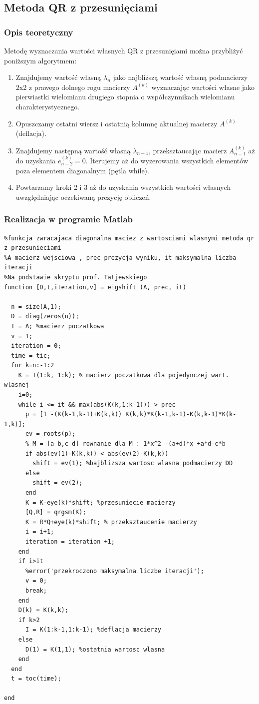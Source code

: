 \documentclass[a4paper, 11pt]{article}
\begin{document}
\subsection{Metoda QR z przesunięciami}
\subsubsection{Opis teoretyczny}
Metodę wyznaczania wartości własnych QR z przesunięiami można przybliżyć poniższym algorytmem:

\begin{enumerate}
  \item Znajdujemy wartość własną $\lambda_{n}$ jako najbliższą wartość własną podmacierzy 2x2 z prawego dolnego rogu macierzy $A^{(k)}$ wyznaczając wartości własne jako pierwiastki wielomianu drugiego stopnia o współczynnikach wielomianu charakterystycznego. 
  \item Opuszczamy ostatni wiersz i ostatnią kolumnę aktualnej macierzy $A^{(k)}$ (deflacja).
  \item Znajdujemy następną wartość własną $\lambda_{n-1}$, przeksztaucając macierz $A_{n-1}^{(k)}$ aż do uzyskania $e_{n-2}^{(k)} = 0$. Iterujemy aż do wyzerowania wszystkich elementów poza elementem diagonalnym (pętla while). 
  \item Powtarzamy kroki 2 i 3 aż do uzyskania wszystkich wartości własnych uwzględniając oczekiwaną prezycję obliczeń. 
\end{enumerate} 

\subsubsection{Realizacja w programie Matlab}
\begin{lstlisting}
%funkcja zwracajaca diagonalna maciez z wartosciami wlasnymi metoda qr z przesunieciami 
%A macierz wejsciowa , prec prezycja wyniku, it maksymalna liczba iteracji
%Na podstawie skryptu prof. Tatjewskiego
function [D,t,iteration,v] = eigshift (A, prec, it)

  n = size(A,1);
  D = diag(zeros(n));
  I = A; %macierz poczatkowa
  v = 1; 
  iteration = 0;
  time = tic;
  for k=n:-1:2
    K = I(1:k, 1:k); % macierz poczatkowa dla pojedynczej wart. wlasnej
    i=0; 
    while i <= it && max(abs(K(k,1:k-1))) > prec
      p = [1 -(K(k-1,k-1)+K(k,k)) K(k,k)*K(k-1,k-1)-K(k,k-1)*K(k-1,k)];
      ev = roots(p);
      % M = [a b,c d] rownanie dla M : 1*x^2 -(a+d)*x +a*d-c*b
      if abs(ev(1)-K(k,k)) < abs(ev(2)-K(k,k))
        shift = ev(1); %bajblizsza wartosc wlasna podmacierzy DD
      else
        shift = ev(2); 
      end
      K = K-eye(k)*shift; %przesuniecie macierzy
      [Q,R] = qrgsm(K); 
      K = R*Q+eye(k)*shift; % przeksztaucenie macierzy
      i = i+1;
      iteration = iteration +1;
    end
    if i>it
      %error('przekroczono maksymalna liczbe iteracji');
      v = 0; 
      break;
    end
    D(k) = K(k,k);
    if k>2
      I = K(1:k-1,1:k-1); %deflacja macierzy
    else
      D(1) = K(1,1); %ostatnia wartosc wlasna
    end
  end
  t = toc(time);
  
end

\end{lstlisting}
\end{document}
